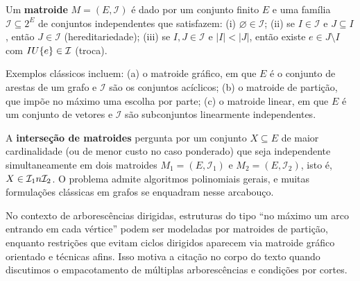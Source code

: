 \documentclass[12pt,a4paper]{article}
\def\emph#1{#1}%
\def\cup{\string U}%
\def\cap{\string n}%
\begin{document}
Um \textbf{matroide} $M=(E,\mathcal{I})$ é dado por um conjunto finito $E$ e uma família $\mathcal{I}\subseteq 2^{E}$ de conjuntos \emph{independentes} que satisfazem: (i) $\varnothing\in\mathcal{I}$; (ii) se $I\in\mathcal{I}$ e $J\subseteq I$, então $J\in\mathcal{I}$ (hereditariedade); (iii) se $I,J\in\mathcal{I}$ e $|I|<|J|$, então existe $e\in J\setminus I$ com $I\cup\{e\}\in\mathcal{I}$ (troca).

Exemplos clássicos incluem: (a) o matroide gráfico, em que $E$ é o conjunto de arestas de um grafo e $\mathcal{I}$ são os conjuntos acíclicos; (b) o matroide de partição, que impõe no máximo uma escolha por parte; (c) o matroide linear, em que $E$ é um conjunto de vetores e $\mathcal{I}$ são subconjuntos linearmente independentes.

A \textbf{interseção de matroides} pergunta por um conjunto $X\subseteq E$ de maior cardinalidade (ou de menor custo no caso ponderado) que seja independente simultaneamente em dois matroides $M_1=(E,\mathcal{I}_1)$ e $M_2=(E,\mathcal{I}_2)$, isto é, $X\in\mathcal{I}_1\cap\mathcal{I}_2$. O problema admite algoritmos polinomiais gerais, e muitas formulações clássicas em grafos se enquadram nesse arcabouço.

No contexto de arborescências dirigidas, estruturas do tipo “no máximo um arco entrando em cada vértice” podem ser modeladas por matroides de partição, enquanto restrições que evitam ciclos dirigidos aparecem via matroide gráfico orientado e técnicas afins. Isso motiva a citação no corpo do texto quando discutimos o empacotamento de múltiplas arborescências e condições por cortes.

\bigskip
\printbibliography
\end{document}
